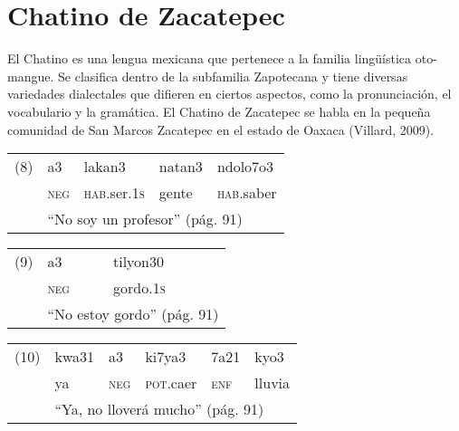 \section*{Chatino de Zacatepec}

\noindent El Chatino es una lengua mexicana que pertenece a la familia lingüística oto-mangue. Se clasifica dentro de la subfamilia Zapotecana y tiene diversas variedades dialectales que difieren en ciertos aspectos, como la pronunciación, el vocabulario y la gramática. El Chatino de Zacatepec se habla en la pequeña comunidad de San Marcos Zacatepec en el estado de Oaxaca (Villard, 2009). \vspace{1cm}

{\setmainfont{Doulos SIL}
    \begin{tabular}{lllll}
        (8) & a3                                                 & lakan3              & natan3 & ndolo7o3  \\
            & \textsc{neg}                                       & \textsc{hab}.ser.\textsc{1s} & gente  & \textsc{hab}.saber \\
            & \multicolumn{4}{l}{“No soy un profesor” (pág. 91)}                                            \\
    \end{tabular}
    \vspace{0.5cm}

    \begin{tabular}{lll}
        (9) & a3                                             & tilyon30          \\
            & \textsc{neg}                                   & gordo.\textsc{1s} \\
            & \multicolumn{2}{l}{“No estoy gordo” (pág. 91)}                     \\
    \end{tabular}
    \vspace{0.5cm}

    \begin{tabular}{llllll}
        (10) & kwa31                                                & a3           & ki7ya3            & 7a21         & kyo3   \\
             & ya                                                   & \textsc{neg} & \textsc{pot}.caer & \textsc{enf} & lluvia \\
             & \multicolumn{5}{l}{“Ya, no lloverá mucho” (pág. 91)}                                                            \\
    \end{tabular}
} \vspace{1cm}

